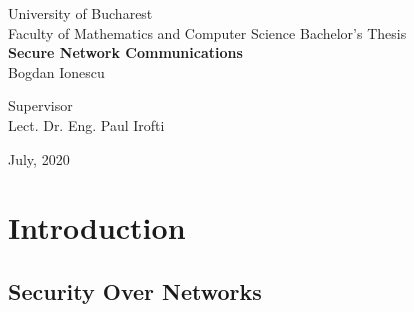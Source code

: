 \documentclass[a4paper,12pt]{report}
\begin{document}
	\begin{titlepage}
		\begin{center}
			\vspace{-10in}
			{\LARGE University of Bucharest \\
			Faculty of Mathematics and Computer Science }
			\vfill
			{\Large Bachelor's Thesis} \\
			\vspace{10mm}
			\textbf{\Huge Secure Network Communications} \\
			{\LARGE Bogdan Ionescu} \\
			\vspace{20mm}
			\begin{flushleft}{\large Supervisor \\
			Lect. Dr. Eng. Paul Irofti}
			\end{flushleft}
			\vfill
			July, 2020
		\restoregeometry
		\end{center}
	\end{titlepage}
	\author{Bogdan Ionescu}
	\date{\today}
	
	\begin{abstract}
		This thesis aims to describe different potential security vulnerabilities when using public networks, such as the Internet, as well as suitable methods on how they can be resolved. The first chapter presents the dangers one might encounter while traversing public networks and how VPNs make use of tunneling protocols to mitigate them. We then take a deep dive into IPsec, a very popular and adaptable network protocol suite designed to address a plethora of security needs for both casual users and businesses. Finally, a software application written in the Go programming language is outlined, with the purpose of demonstrating how securing network traffic would be implemented.
	\end{abstract}		
	
	\tableofcontents
	
	\setlength{\glsdescwidth}{\hsize}
	\glsaddall
	\printglossary[type=\acronymtype,nonumberlist]
	
	\chapter{Introduction}
	
	\section{Security Over Networks}
		
\end{document}
